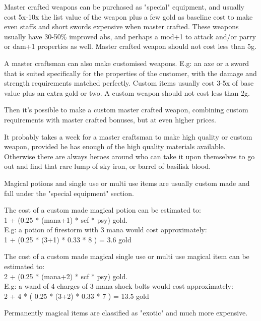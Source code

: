 Master crafted weapons can be purchased as "special" equipment, and usually cost 5x-10x the list value of the weapon plus a few gold as baseline cost to make even staffs and short swords expensive when master crafted. These weapons usually have 30-50\% improved abs, and perhaps a mod+1 to attack and/or parry or dam+1 properties as well. Master crafted weapon should not cost less than 5g.

A master craftsman can also make customised weapons. E.g: an axe or a sword that is suited specifically for the properties of the customer, with the damage and strength requirements matched perfectly. Custom items usually cost 3-5x of base value plus an extra gold or two. A custom weapon should not cost less than 2g.

Then it's possible to make a custom master crafted weapon, combining custom requirements with master crafted bonuses, but at even higher prices.

It probably takes a week for a master craftsman to make high quality or custom weapon, provided he has enough of the high quality materials available. Otherwise there are always heroes around who can take it upon themselves to go out and find that rare lump of sky iron, or barrel of basilisk blood.

Magical potions and single use or multi use items are usually custom made and fall under the "special equipment" section.

The cost of a custom made magical potion can be estimated to:\\
1 + (0.25 * (mana+1) * scf * psy) gold. \\
E.g: a potion of firestorm with 3 mana would cost approximately:\\
1 + (0.25 * (3+1) * 0.33 * 8 ) = 3.6 gold

The cost of a custom made magical single use or multi use magical item can be estimated to: \\
2 + (0.25 * (mana+2) * scf * psy) gold. \\
E.g: a wand of 4 charges of 3 mana shock bolts would cost approximately: \\
2 + 4 * ( 0.25 * (3+2) * 0.33 * 7 ) = 13.5 gold

Permanently magical items are classified as "exotic" and much more expensive.





